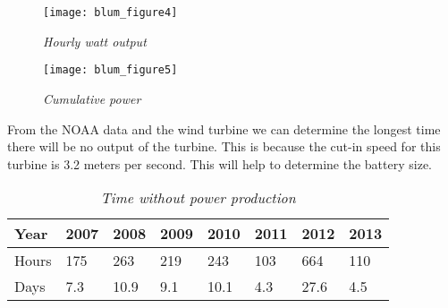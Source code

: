 \begin{figure}
\centering
\texttt{[image: blum\_figure4]}
\caption{\textit{Hourly watt output}}
\label{fig:Hourly output in watts}
\end{figure}


\begin{figure}
\centering
\texttt{[image: blum\_figure5]}
\caption{\textit{Cumulative power}}
\label{fig: Cumlative power}
\end{figure}

From the NOAA data and the wind turbine we can determine the longest time there will be no output of the turbine. This is because the cut-in speed for this turbine is 3.2 meters per second. This will help to determine the battery size. 

\begin{table}
\centering
\begin{tabular}{|l|l|l|l|l|l|l|l|}\hline
Year & 2007 & 2008 & 2009 & 2010 & 2011 & 2012 &2013\\\hline
Hours & 175 & 263 & 219 & 243 & 103 & 664 & 110\\\hline
Days & 7.3 & 10.9 & 9.1 & 10.1 & 4.3 & 27.6& 4.5\\\hline
\end{tabular}
\caption{\textit{Time without power production}}
\label{tab:widgets}
\end{table}

